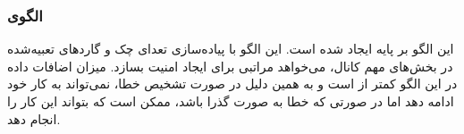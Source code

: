 \subsubsection{الگوی }
\label{safeProtSingleChSec}
\begin{RTL}
این الگو بر پایه  ایجاد شده است.
این الگو با پیاده‌سازی تعدای چک و گاردهای تعبیه‌شده در بخش‌های مهم
کانال، می‌خواهد مراتبی برای ایجاد امنیت بسازد. میزان اضافات داده
در این الگو کمتر از  است و به همین دلیل در
صورت تشخیص خطا، نمی‌تواند به کار خود ادامه دهد اما در صورتی
که خطا به صورت گذرا باشد، ممکن است که بتواند این کار را انجام
دهد.
\end{RTL}